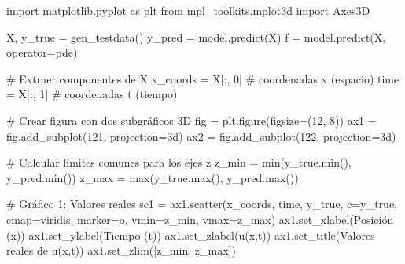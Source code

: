 \documentclass[
  spanish,
  us-letterpaper,
  DIV=11,
  numbers=noendperiod]{scrreprt}
\newenvironment{Shaded}{\begin{snugshade}}{\end{snugshade}}
\newcommand{\BuiltInTok}[1]{\textcolor[rgb]{0.00,0.23,0.31}{#1}}
\newcommand{\CommentTok}[1]{\textcolor[rgb]{0.37,0.37,0.37}{#1}}
\newcommand{\DecValTok}[1]{\textcolor[rgb]{0.68,0.00,0.00}{#1}}
\newcommand{\ImportTok}[1]{\textcolor[rgb]{0.00,0.46,0.62}{#1}}
\newcommand{\NormalTok}[1]{\textcolor[rgb]{0.00,0.23,0.31}{#1}}
\newcommand{\OperatorTok}[1]{\textcolor[rgb]{0.37,0.37,0.37}{#1}}
\newcommand{\StringTok}[1]{\textcolor[rgb]{0.13,0.47,0.30}{#1}}
\theoremstyle{plain}
\theoremstyle{definition}
\theoremstyle{remark}
\begin{document}
\begin{Shaded}
\begin{Highlighting}[]
\ImportTok{import}\NormalTok{ matplotlib.pyplot }\ImportTok{as}\NormalTok{ plt }
\ImportTok{from}\NormalTok{ mpl\_toolkits.mplot3d }\ImportTok{import}\NormalTok{ Axes3D}

\NormalTok{X, y\_true }\OperatorTok{=}\NormalTok{ gen\_testdata()}
\NormalTok{y\_pred }\OperatorTok{=}\NormalTok{ model.predict(X)}
\NormalTok{f }\OperatorTok{=}\NormalTok{ model.predict(X, operator}\OperatorTok{=}\NormalTok{pde)}

\CommentTok{\# Extraer componentes de X}
\NormalTok{x\_coords }\OperatorTok{=}\NormalTok{ X[:, }\DecValTok{0}\NormalTok{]  }\CommentTok{\# coordenadas x (espacio)}
\NormalTok{time }\OperatorTok{=}\NormalTok{ X[:, }\DecValTok{1}\NormalTok{]      }\CommentTok{\# coordenadas t (tiempo)}

\CommentTok{\# Crear figura con dos subgráficos 3D}
\NormalTok{fig }\OperatorTok{=}\NormalTok{ plt.figure(figsize}\OperatorTok{=}\NormalTok{(}\DecValTok{12}\NormalTok{, }\DecValTok{8}\NormalTok{))}
\NormalTok{ax1 }\OperatorTok{=}\NormalTok{ fig.add\_subplot(}\DecValTok{121}\NormalTok{, projection}\OperatorTok{=}\StringTok{\textquotesingle{}3d\textquotesingle{}}\NormalTok{)}
\NormalTok{ax2 }\OperatorTok{=}\NormalTok{ fig.add\_subplot(}\DecValTok{122}\NormalTok{, projection}\OperatorTok{=}\StringTok{\textquotesingle{}3d\textquotesingle{}}\NormalTok{)}

\CommentTok{\# Calcular límites comunes para los ejes z}
\NormalTok{z\_min }\OperatorTok{=} \BuiltInTok{min}\NormalTok{(y\_true.}\BuiltInTok{min}\NormalTok{(), y\_pred.}\BuiltInTok{min}\NormalTok{())}
\NormalTok{z\_max }\OperatorTok{=} \BuiltInTok{max}\NormalTok{(y\_true.}\BuiltInTok{max}\NormalTok{(), y\_pred.}\BuiltInTok{max}\NormalTok{())}

\CommentTok{\# Gráfico 1: Valores reales}
\NormalTok{sc1 }\OperatorTok{=}\NormalTok{ ax1.scatter(x\_coords, time, y\_true, c}\OperatorTok{=}\NormalTok{y\_true,}
\NormalTok{                cmap}\OperatorTok{=}\StringTok{\textquotesingle{}viridis\textquotesingle{}}\NormalTok{, marker}\OperatorTok{=}\StringTok{\textquotesingle{}o\textquotesingle{}}\NormalTok{, vmin}\OperatorTok{=}\NormalTok{z\_min, vmax}\OperatorTok{=}\NormalTok{z\_max)}
\NormalTok{ax1.set\_xlabel(}\StringTok{\textquotesingle{}Posición (x)\textquotesingle{}}\NormalTok{)}
\NormalTok{ax1.set\_ylabel(}\StringTok{\textquotesingle{}Tiempo (t)\textquotesingle{}}\NormalTok{)}
\NormalTok{ax1.set\_zlabel(}\StringTok{\textquotesingle{}u(x,t)\textquotesingle{}}\NormalTok{)}
\NormalTok{ax1.set\_title(}\StringTok{\textquotesingle{}Valores reales de u(x,t)\textquotesingle{}}\NormalTok{)}
\NormalTok{ax1.set\_zlim([z\_min, z\_max])}


\end{Highlighting}
\end{Shaded}
\end{document}
